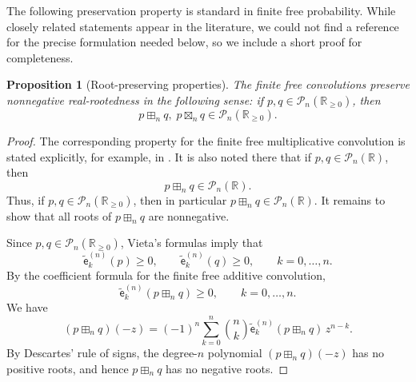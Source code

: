 \documentclass[a4paper,11pt]{amsart}
\numberwithin{equation}{section}
\newtheorem{proposition}[theorem]{Proposition}
\newcommand{\R}{\mathbb{R}}
\newcommand{\pols}{\mathcal P}
\newcommand{\coef}[2]{\widetilde{\mathsf{e}}_{#1}^{(#2)}} %
\begin{document}
The following preservation property is standard in finite free probability. While closely related statements appear in the literature, we could not find a reference for the precise formulation needed below, so we include a short proof for completeness.
\begin{proposition}[Root-preserving properties]\label{prop:pres}
The finite free convolutions preserve nonnegative real-rootedness in the following sense: if
\(p,q\in \pols_n(\R_{\ge 0})\), then
\[
p\boxplus_n q,\; p\boxtimes_n q \in \pols_n(\R_{\ge 0}).
\]
\end{proposition}

\begin{proof}
The corresponding property for the finite free multiplicative convolution is stated explicitly, for example, in \cite[Section 2.5]{AGP23}. It is also noted there that if \(p,q\in\pols_n(\R)\), then
\[
p\boxplus_n q\in\pols_n(\R).
\]
Thus, if \(p,q\in\pols_n(\R_{\ge 0})\), then in particular $p\boxplus_n q\in\pols_n(\R)$.
It remains to show that all roots of \(p\boxplus_n q\) are nonnegative.

Since \(p,q\in\pols_n(\R_{\ge 0})\), Vieta's formulas imply that
\[
\coef{k}{n}(p)\ge 0,
\qquad
\coef{k}{n}(q)\ge 0,
\qquad k=0,\dots,n.
\]
By the coefficient formula for the finite free additive convolution,
\[
\coef{k}{n}(p\boxplus_n q)
\ge 0,
\qquad k=0,\dots,n.
\]
We have
\[
(p\boxplus_n q)(-z)
= (-1)^n
\sum_{k=0}^n \binom{n}{k}\coef{k}{n}(p\boxplus_n q)\, z^{n-k}.
\]
By Descartes' rule of signs, the degree-$n$ polynomial \((p\boxplus_n q)(-z)\) has no positive roots, and hence \(p\boxplus_n q\) has no negative roots. 
\end{proof}
\end{document}
